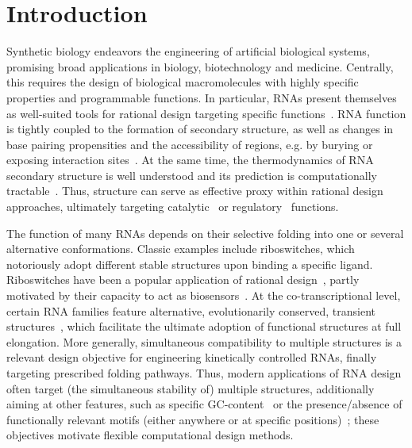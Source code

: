 \documentclass{bioinfo}
\newcommand{\parHead}[1]{\Final{\paragraph{#1}}}
\newcommand{\Final}[1]{#1}
\renewcommand{\Final}[1]{}
\newcommand{\Nuc}[1]{{\sf #1}}
\newcommand{\Cb}{\Nuc{C}}
\newcommand{\Gb}{\Nuc{G}}
\begin{document}
\maketitle



\section{Introduction}
\parHead{Design, applications and motivation for multiple design.}Synthetic biology endeavors the engineering of artificial biological
systems, promising broad applications in biology, biotechnology and
medicine. Centrally, this requires the design of biological
macromolecules with highly specific properties and programmable functions.
In particular, RNAs present themselves as well-suited tools for
rational design targeting specific functions~\cite{Kushwaha2016}. RNA function is tightly
coupled to the formation of secondary structure, as well as changes in
base pairing propensities and the accessibility of regions, e.g. by
burying or exposing interaction sites~\cite{Rodrigo2014}. At the same time, the
thermodynamics of RNA secondary structure is well understood and its prediction is
computationally tractable~\cite{McCaskill1990}. Thus,  structure can serve as effective
proxy within rational design approaches, ultimately targeting catalytic~\cite{Zhang2013} or regulatory~\cite{Rodrigo2014} functions.

\parHead{Motivating multiple RNA design.} The function of many RNAs
depends on their selective folding into one or several alternative
conformations. Classic examples include riboswitches, which
notoriously adopt different stable structures upon binding a specific
ligand. Riboswitches have been a popular application of rational
design~\cite{Wachsmuth2013,Domin2017}, partly motivated by their capacity to
act as biosensors~\cite{Findeiss2017}. At the co-transcriptional
level, certain RNA families feature alternative, evolutionarily
conserved, transient structures~\cite{Zhu2013}, which facilitate the
ultimate adoption of functional structures at full elongation.  More
generally, simultaneous compatibility to multiple structures
is a relevant design objective for engineering kinetically controlled RNAs, finally targeting prescribed folding pathways. Thus,
modern applications of RNA design often target (the simultaneous
stability of) multiple structures, additionally aiming at other
features, such as specific \Gb\Cb-content~\cite{Reinharz2013} or the
presence/absence of functionally relevant motifs (either anywhere or
at specific positions)~\cite{Zhou2013}; these objectives motivate flexible
computational design methods.
\end{document}
